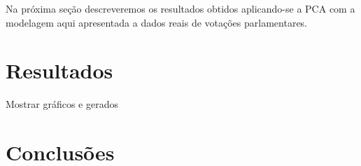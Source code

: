 \documentclass[a4paper, 12pt]{article}
\begin{document}
Na próxima seção descreveremos os resultados obtidos aplicando-se a PCA com a modelagem aqui apresentada a dados reais de votações parlamentares.

\section{Resultados}
\label{sec:resultado}

Mostrar gráficos e gerados 


\section{Conclusões}
\label{sec:conclusoes}





 
\end{document}
